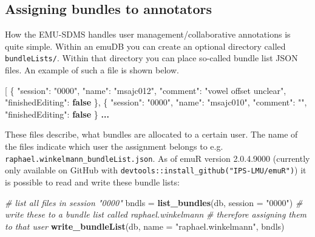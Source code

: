 \documentclass[]{book}
\newenvironment{Shaded}{\begin{snugshade}}{\end{snugshade}}
\newcommand{\CommentTok}[1]{\textcolor[rgb]{0.56,0.35,0.01}{\textit{#1}}}
\newcommand{\DataTypeTok}[1]{\textcolor[rgb]{0.13,0.29,0.53}{#1}}
\newcommand{\ErrorTok}[1]{\textcolor[rgb]{0.64,0.00,0.00}{\textbf{#1}}}
\newcommand{\FunctionTok}[1]{\textcolor[rgb]{0.00,0.00,0.00}{#1}}
\newcommand{\KeywordTok}[1]{\textcolor[rgb]{0.13,0.29,0.53}{\textbf{#1}}}
\newcommand{\NormalTok}[1]{#1}
\newcommand{\OtherTok}[1]{\textcolor[rgb]{0.56,0.35,0.01}{#1}}
\newcommand{\StringTok}[1]{\textcolor[rgb]{0.31,0.60,0.02}{#1}}
\begin{document}
\hypertarget{assigning-bundles-to-annotators}{%
\subsection{Assigning bundles to annotators}\label{assigning-bundles-to-annotators}}

How the EMU-SDMS handles user management/collaborative annotations is quite simple. Within an emuDB you can create an optional directory called \texttt{bundleLists/}. Within that directory you can place so-called bundle list JSON files. An example of such a file is shown below.

\begin{Shaded}
\begin{Highlighting}[]
\OtherTok{[}
    \FunctionTok{\{}
        \DataTypeTok{"session"}\FunctionTok{:} \StringTok{"0000"}\FunctionTok{,}
        \DataTypeTok{"name"}\FunctionTok{:} \StringTok{"msajc012"}\FunctionTok{,}
        \DataTypeTok{"comment"}\FunctionTok{:} \StringTok{"vowel offset unclear"}\FunctionTok{,}
        \DataTypeTok{"finishedEditing"}\FunctionTok{:} \KeywordTok{false}
    \FunctionTok{\}}\OtherTok{,}
    \FunctionTok{\{}
        \DataTypeTok{"session"}\FunctionTok{:} \StringTok{"0000"}\FunctionTok{,}
        \DataTypeTok{"name"}\FunctionTok{:} \StringTok{"msajc010"}\FunctionTok{,}
        \DataTypeTok{"comment"}\FunctionTok{:} \StringTok{""}\FunctionTok{,}
        \DataTypeTok{"finishedEditing"}\FunctionTok{:} \KeywordTok{false}
    \FunctionTok{\}}
\ErrorTok{...}
\end{Highlighting}
\end{Shaded}

These files describe, what bundles are allocated to a certain user. The name of the files indicate which user the assignment belongs to e.g. \texttt{raphael.winkelmann\_bundleList.json}. As of emuR version 2.0.4.9000 (currently only available on GitHub with \texttt{devtools::install\_github("IPS-LMU/emuR")}) it is possible to read and write these bundle lists:

\begin{Shaded}
\begin{Highlighting}[]
\CommentTok{# list all files in session "0000"}
\NormalTok{bndls =}\StringTok{ }\KeywordTok{list_bundles}\NormalTok{(db, }
                     \DataTypeTok{session =} \StringTok{"0000"}\NormalTok{)}
\CommentTok{# write these to a bundle list called raphael.winkelmann}
\CommentTok{# therefore assigning them to that user }
\KeywordTok{write_bundleList}\NormalTok{(db, }
                 \DataTypeTok{name =} \StringTok{"raphael.winkelmann"}\NormalTok{, }
\NormalTok{                 bndls)}
\end{Highlighting}
\end{Shaded}
\end{document}
